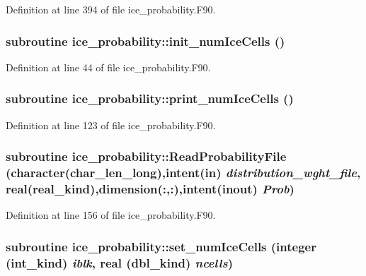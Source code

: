 Definition at line 394 of file ice\_\-probability.F90.\hypertarget{namespaceice__probability_a4df379181c71e4ceeb1ef127de0dace0}{
\subsubsection[{init\_\-numIceCells}]{\setlength{\rightskip}{0pt plus 5cm}subroutine ice\_\-probability::init\_\-numIceCells ()}}
\label{namespaceice__probability_a4df379181c71e4ceeb1ef127de0dace0}


Definition at line 44 of file ice\_\-probability.F90.\hypertarget{namespaceice__probability_aecdab917ec3ada7a8242d8fd3a57aa8c}{
\subsubsection[{print\_\-numIceCells}]{\setlength{\rightskip}{0pt plus 5cm}subroutine ice\_\-probability::print\_\-numIceCells ()}}
\label{namespaceice__probability_aecdab917ec3ada7a8242d8fd3a57aa8c}


Definition at line 123 of file ice\_\-probability.F90.\hypertarget{namespaceice__probability_aae3f520676ae6acd850363f60f637c3f}{
\subsubsection[{ReadProbabilityFile}]{\setlength{\rightskip}{0pt plus 5cm}subroutine ice\_\-probability::ReadProbabilityFile (character(char\_\-len\_\-long),intent(in) {\em distribution\_\-wght\_\-file}, \/  real(real\_\-kind),dimension(:,:),intent(inout) {\em Prob})}}
\label{namespaceice__probability_aae3f520676ae6acd850363f60f637c3f}


Definition at line 156 of file ice\_\-probability.F90.\hypertarget{namespaceice__probability_af08e27cf4323fd5da1b0920c8e9b6532}{
\subsubsection[{set\_\-numIceCells}]{\setlength{\rightskip}{0pt plus 5cm}subroutine ice\_\-probability::set\_\-numIceCells (integer (int\_\-kind) {\em iblk}, \/  real (dbl\_\-kind) {\em ncells})}}
\label{namespaceice__probability_af08e27cf4323fd5da1b0920c8e9b6532}


